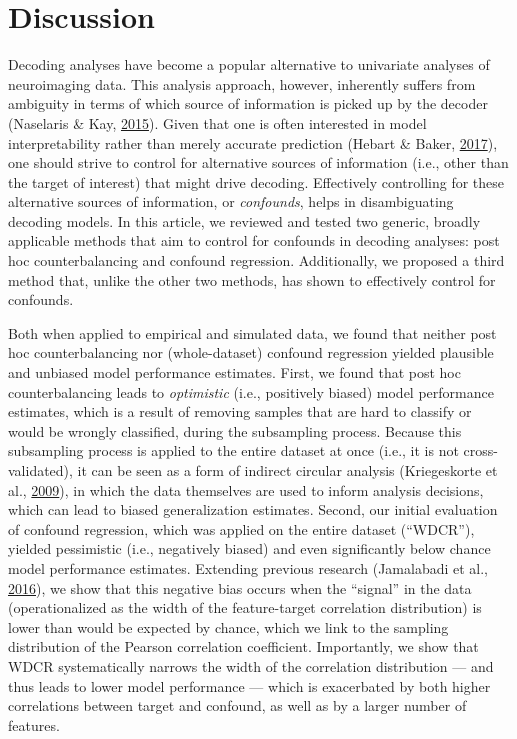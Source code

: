 \documentclass[11pt,american,a4paper,oneside,]{memoir} %
\begin{document}
\hypertarget{confounds-decoding-discussion}{%
\section{Discussion}\label{confounds-decoding-discussion}}

Decoding analyses have become a popular alternative to univariate analyses of neuroimaging data. This analysis approach, however, inherently suffers from ambiguity in terms of which source of information is picked up by the decoder (Naselaris \& Kay, \protect\hyperlink{ref-Naselaris2015-jn}{2015}). Given that one is often interested in model interpretability rather than merely accurate prediction (Hebart \& Baker, \protect\hyperlink{ref-Hebart2017-jn}{2017}), one should strive to control for alternative sources of information (i.e., other than the target of interest) that might drive decoding. Effectively controlling for these alternative sources of information, or \emph{confounds}, helps in disambiguating decoding models. In this article, we reviewed and tested two generic, broadly applicable methods that aim to control for confounds in decoding analyses: post hoc counterbalancing and confound regression. Additionally, we proposed a third method that, unlike the other two methods, has shown to effectively control for confounds.

Both when applied to empirical and simulated data, we found that neither post hoc counterbalancing nor (whole-dataset) confound regression yielded plausible and unbiased model performance estimates. First, we found that post hoc counterbalancing leads to \emph{optimistic} (i.e., positively biased) model performance estimates, which is a result of removing samples that are hard to classify or would be wrongly classified, during the subsampling process. Because this subsampling process is applied to the entire dataset at once (i.e., it is not cross-validated), it can be seen as a form of indirect circular analysis (Kriegeskorte et al., \protect\hyperlink{ref-kriegeskorte2009circular}{2009}), in which the data themselves are used to inform analysis decisions, which can lead to biased generalization estimates. Second, our initial evaluation of confound regression, which was applied on the entire dataset (``WDCR''), yielded pessimistic (i.e., negatively biased) and even significantly below chance model performance estimates. Extending previous research (Jamalabadi et al., \protect\hyperlink{ref-Jamalabadi2016-gr}{2016}), we show that this negative bias occurs when the ``signal'' in the data (operationalized as the width of the feature-target correlation distribution) is lower than would be expected by chance, which we link to the sampling distribution of the Pearson correlation coefficient. Importantly, we show that WDCR systematically narrows the width of the correlation distribution --- and thus leads to lower model performance --- which is exacerbated by both higher correlations between target and confound, as well as by a larger number of features.
\end{document}
